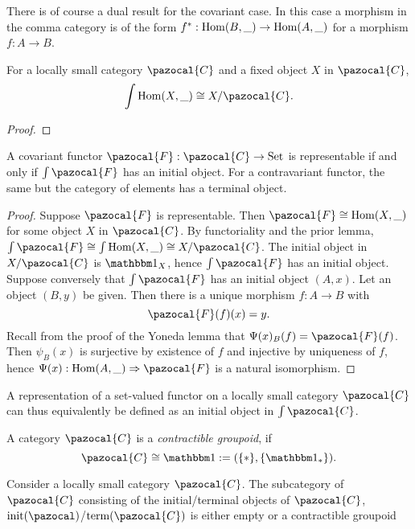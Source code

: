 \begin{remark}
    There is of course a dual result for the covariant case. In this case a morphism in the comma category is of the form $f^\ast : \mathrm{Hom}(B,\_)\rightarrow \mathrm{Hom}(A,\_)$ for a morphism $f: A \rightarrow B$. 
\end{remark}
\begin{lemma}
    For a locally small category $\pazocal{C}$ and a fixed object $X$ in $\pazocal{C}$, 
    $$\int \Hom(X,\_) \cong X/\pazocal{C}.$$
\end{lemma}
\begin{proof}
    
\end{proof}
\begin{proposition}
    A covariant functor $\pazocal{F} : \pazocal{C}\rightarrow \mathrm{Set}$ is representable if and only if $\int \pazocal{F}$ has an initial object. For a contravariant functor, the same but the category of elements has a terminal object.  
\end{proposition}
\begin{proof}
    Suppose $\pazocal{F}$ is representable. Then $\pazocal{F}\cong \Hom(X,\_)$ for some object $X$ in $\pazocal{C}$. By functoriality and the prior lemma, $\int \pazocal{F}\cong  \int \Hom(X,\_)\cong  X/\pazocal{C}$. The initial object in $X/\pazocal{C}$ is $\fone_X$, hence $\int \pazocal{F}$ has an initial object.\\
    Suppose conversely that $\int\pazocal{F}$ has an initial object $(A,x)$. Let an object $(B,y)$ be given. Then there is a unique morphism $f : A\rightarrow B$ with 
    $$
        \pazocal{F}(f)(x)=y.
    $$
    Recall from the proof of the Yoneda lemma that $\Psi(x)_B(f)=\pazocal{F}(f)$. Then $\psi_B(x)$ is surjective by existence of $f$ and injective by uniqueness of $f$, hence $\Psi(x): \Hom(A,\_) \Rightarrow \pazocal{F}$ is a natural isomorphism.   
\end{proof}
\begin{remark}
    A representation of a set-valued functor on a locally small category $\pazocal{C}$ can thus equivalently be defined as an initial object in $\int\pazocal{C}$. 
\end{remark}
\begin{definition}
    A category $\pazocal{C}$ is a \emph{contractible groupoid}, if 
    $$
        \pazocal{C} \cong \fone := (\{\ast\},\{\fone_\ast\}).
    $$
\end{definition}
\begin{lemma}
    Consider a locally small category $\pazocal{C}$. The subcategory of $\pazocal{C}$ consisting of the initial/terminal objects of $\pazocal{C}$, $\mathrm{init}(\pazocal)$/$\mathrm{term}(\pazocal{C})$ is either empty or a contractible groupoid
\end{lemma}
